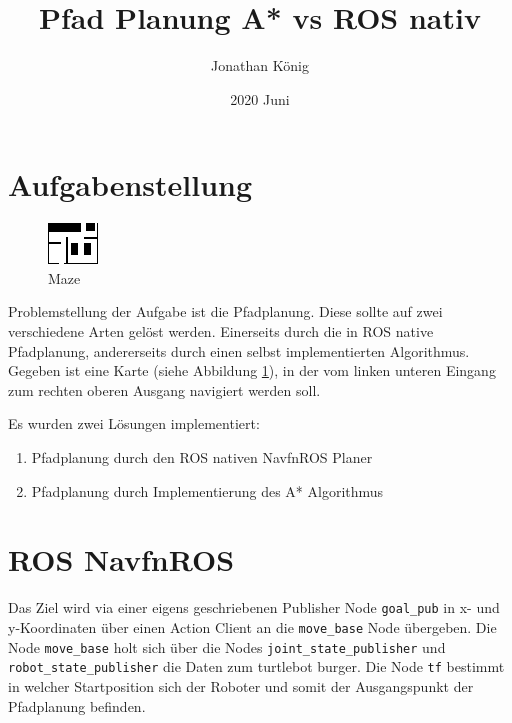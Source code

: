 \documentclass{article}
\title{Pfad Planung A* vs ROS nativ}
\date{2020 Juni}
\author{Jonathan König}
\begin{document}
\maketitle
\newpage

\tableofcontents

\newpage
\clearpage
{}



\section{Aufgabenstellung}

\begin{figure}[!htbp]
    \centering
    \includegraphics[width=0.5\linewidth]{../src/koenig/maps/bmrMap.png}
    \caption{Maze}\label{map}
\end{figure}

Problemstellung der Aufgabe ist die Pfadplanung. Diese sollte auf zwei verschiedene Arten gelöst werden. Einerseits durch die in ROS native Pfadplanung, andererseits durch einen selbst implementierten Algorithmus.
Gegeben ist eine Karte (siehe Abbildung \ref{map}), in der vom linken unteren Eingang zum rechten oberen Ausgang navigiert werden soll.

Es wurden zwei Lösungen implementiert:
\begin{enumerate}
    \item Pfadplanung durch den ROS nativen NavfnROS Planer
    \item Pfadplanung durch Implementierung des A* Algorithmus 
\end{enumerate}

\section{ROS NavfnROS }
\label{DWAPlannerROS}

Das Ziel wird via einer eigens geschriebenen Publisher Node \verb|goal_pub| in x- und y-Koordinaten über einen Action Client an die \verb|move_base| Node übergeben.
Die Node \verb|move_base| holt sich über die Nodes \verb|joint_state_publisher| und \verb|robot_state_publisher| die Daten zum turtlebot burger. Die Node \verb|tf| bestimmt in welcher Startposition sich der Roboter und somit der Ausgangspunkt der Pfadplanung befinden.
\end{document}
